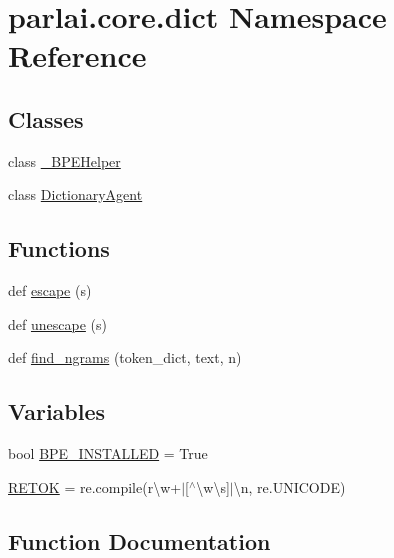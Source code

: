 \hypertarget{namespaceparlai_1_1core_1_1dict}{}\section{parlai.\+core.\+dict Namespace Reference}
\label{namespaceparlai_1_1core_1_1dict}
\subsection*{Classes}
\begin{DoxyCompactItemize}
\item 
class \hyperlink{classparlai_1_1core_1_1dict_1_1__BPEHelper}{\+\_\+\+B\+P\+E\+Helper}
\item 
class \hyperlink{classparlai_1_1core_1_1dict_1_1DictionaryAgent}{Dictionary\+Agent}
\end{DoxyCompactItemize}
\subsection*{Functions}
\begin{DoxyCompactItemize}
\item 
def \hyperlink{namespaceparlai_1_1core_1_1dict_ae44fe4a2be005a4023a758a58f656495}{escape} (s)
\item 
def \hyperlink{namespaceparlai_1_1core_1_1dict_a4d8952ff127b540967c707a58e8ebb48}{unescape} (s)
\item 
def \hyperlink{namespaceparlai_1_1core_1_1dict_a5e9eb43b6c0dce0b3aab7f3ea3717de6}{find\+\_\+ngrams} (token\+\_\+dict, text, n)
\end{DoxyCompactItemize}
\subsection*{Variables}
\begin{DoxyCompactItemize}
\item 
bool \hyperlink{namespaceparlai_1_1core_1_1dict_a9adf6ecd08289a0b0faa90fd2a507e91}{B\+P\+E\+\_\+\+I\+N\+S\+T\+A\+L\+L\+ED} = True
\item 
\hyperlink{namespaceparlai_1_1core_1_1dict_acc80030514561837c1010293fd1010f4}{R\+E\+T\+OK} = re.\+compile(r\textquotesingle{}\textbackslash{}w+$\vert$\mbox{[}$^\wedge$\textbackslash{}w\textbackslash{}s\mbox{]}$\vert$\textbackslash{}n\textquotesingle{}, re.\+U\+N\+I\+C\+O\+DE)
\end{DoxyCompactItemize}


\subsection{Function Documentation}
\mbox{\label{namespaceparlai_1_1core_1_1dict_ae44fe4a2be005a4023a758a58f656495}} 
